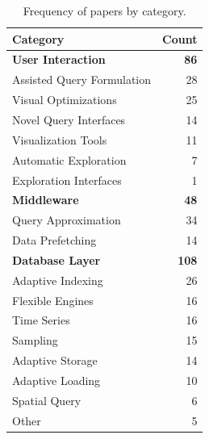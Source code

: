 \begin{table}[hptb]
  \small
  \begin{tabularx}{\textwidth}{X r} \hline
    \textbf{Category} & \textbf{Count} \\ \hline
    \textbf{User Interaction} & \textbf{86} \\
      \hspace{0.5em} Assisted Query Formulation & 28 \\
      \hspace{0.5em} Visual Optimizations & 25 \\
      \hspace{0.5em} Novel Query Interfaces & 14 \\
      \hspace{0.5em} Visualization Tools & 11 \\
      \hspace{0.5em} Automatic Exploration & 7 \\
      \hspace{0.5em} Exploration Interfaces & 1 \\
    \textbf{Middleware} & \textbf{48} \\
      \hspace{0.5em} Query Approximation & 34 \\
      \hspace{0.5em} Data Prefetching & 14 \\
    \textbf{Database Layer} & \textbf{108} \\
      \hspace{0.5em} Adaptive Indexing & 26 \\
      \hspace{0.5em} Flexible Engines & 16 \\
      \hspace{0.5em} Time Series & 16 \\
      \hspace{0.5em} Sampling & 15 \\
      \hspace{0.5em} Adaptive Storage & 14 \\
      \hspace{0.5em} Adaptive Loading & 10 \\
      \hspace{0.5em} Spatial Query & 6 \\
      \hspace{0.5em} Other & 5
  \end{tabularx}
  \caption{Frequency of  papers by category.}\label{tab:mapping/category_summary}
\end{table}

